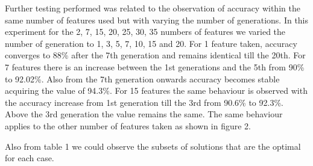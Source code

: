 \documentclass[11pt,onecolumn,a4paper]{article}
\begin{document}
Further testing performed was related to the observation of accuracy within the same number of features used but with varying the number of generations. In this experiment for the 2, 7, 15, 20, 25, 30, 35 numbers of features we varied the number of generation to 1, 3, 5, 7, 10, 15 and 20. For 1 feature taken, accuracy converges to 88\% after the 7th generation and remains identical till the 20th. For 7 features there is an increase between the 1st generations and the 5th from 90\% to 92.02\%. Also from the 7th generation onwards accuracy becomes stable acquiring the value of 94.3\%. For 15 features the same behaviour is observed with the accuracy increase from 1st generation till the 3rd from 90.6\% to 92.3\%. Above the 3rd generation the value remains the same. The same behaviour applies to the other number of features taken as shown in figure 2.
\begin{table}[ht]
\caption{Ionosphere Varying Features }
\end{table}
Also from table 1 we could observe the subsets of solutions that are the optimal for each case.
\end{document}
